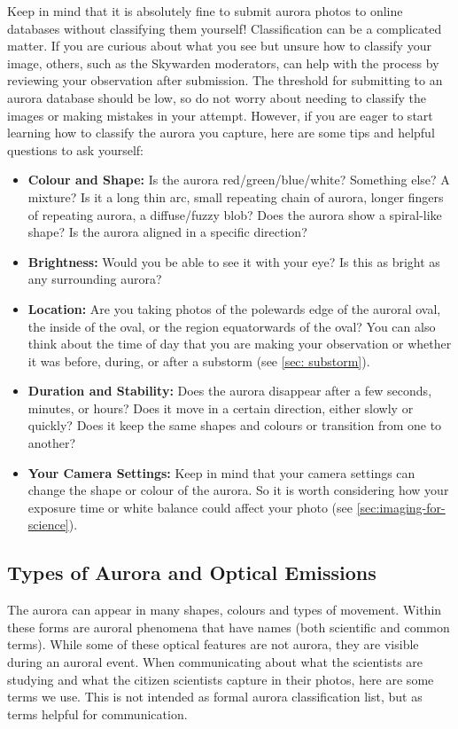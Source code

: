 \documentclass{article}
\newcommand{\contributed}[1]{%
    \par\noindent
    \begingroup
    \setlength{\leftskip}{1em}%
    \itshape
    Contributors: #1
    \par
    \endgroup
    \vspace{0.5em}
}
\begin{document}
Keep in mind that it is absolutely fine to submit aurora photos to online databases without classifying them yourself! Classification can be a complicated matter. If you are curious about what you see but unsure how to classify your image, others, such as the Skywarden moderators, can help with the process by reviewing your observation after submission. The threshold for submitting to an aurora database should be low, so do not worry about needing to classify the images or making mistakes in your attempt. However, if you are eager to start learning how to classify the aurora you capture, here are some tips and helpful questions to ask yourself:
\begin{itemize}
    \item \textbf{Colour and Shape:} Is the aurora red/green/blue/white? Something else? A mixture? Is it a long thin arc, small repeating chain of aurora, longer fingers of repeating aurora, a diffuse/fuzzy blob? Does the aurora show a spiral-like shape? Is the aurora aligned in a specific direction?
    \item \textbf{Brightness:} Would you be able to see it with your eye? Is this as bright as any surrounding aurora?
    \item \textbf{Location:} Are you taking photos of the polewards edge of the auroral oval, the inside of the oval, or the region equatorwards of the oval? You can also think about the time of day that you are making your observation or whether it was before, during, or after a substorm (see \ref{sec: substorm}).
    \item \textbf{Duration and Stability:} Does the aurora disappear after a few seconds, minutes, or hours? Does it move in a certain direction, either slowly or quickly? Does it keep the same shapes and colours or transition from one to another?
    \item \textbf{Your Camera Settings:} Keep in mind that your camera settings can change the shape or colour of the aurora. So it is worth considering how your exposure time or white balance could affect your photo (see \ref{sec:imaging-for-science}).
\end{itemize}


\subsection{Types of Aurora and Optical Emissions}
\label{sec: types of aurora}

The aurora can appear in many shapes, colours and types of movement.  Within these forms are auroral phenomena that have names (both scientific and common terms). While some of these optical features are not aurora, they are visible during an auroral event. When communicating about what the scientists are studying and what the citizen scientists capture in their photos, here are some terms we use. This is not intended as formal aurora classification list, but as terms helpful for communication.
\end{document}
